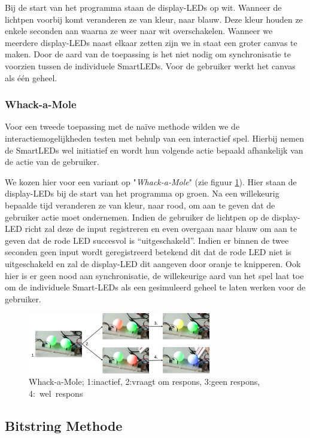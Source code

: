 \documentclass{article}
\begin{document}
Bij de start van het programma staan de display-LEDs op wit. Wanneer de lichtpen voorbij komt veranderen ze van kleur, naar blauw. Deze kleur houden ze enkele seconden aan waarna ze weer naar wit overschakelen. Wanneer we meerdere display-LEDs naast elkaar zetten zijn we in staat een groter canvas te maken. Door de aard van de toepassing is het niet nodig om synchronisatie te voorzien tussen de individuele SmartLEDs. Voor de gebruiker werkt het canvas als \'e\'en geheel.


\subsubsection{Whack-a-Mole}
Voor een tweede toepassing met de na\"ive methode wilden we de interactiemogelijkheden testen met behulp van een interactief spel. Hierbij nemen de SmartLEDs wel initiatief en wordt hun volgende actie bepaald afhankelijk van de actie van de gebruiker. 

We kozen hier voor een variant op "\textit{Whack-a-Mole}" (zie figuur \ref{fig:mole}). Hier staan de display-LEDs bij de start van het programma op groen. Na een willekeurig bepaalde tijd veranderen ze van kleur, naar rood, om aan te geven dat de gebruiker actie moet ondernemen. Indien de gebruiker de lichtpen op de display-LED richt zal deze de input registreren en even overgaan naar blauw om aan te geven dat de rode LED succesvol is “uitgeschakeld”. Indien er binnen de twee seconden geen input wordt geregistreerd betekend dit dat de rode LED niet is uitgeschakeld en zal de display-LED dit aangeven door oranje te knipperen.  
Ook hier is er geen nood aan synchronisatie, de willekeurige aard van het spel laat toe om de individuele Smart-LEDs als een gesimuleerd geheel te laten werken voor de gebruiker.


\begin{figure}[H]
\centering
\includegraphics[width=8cm]{moleSequence.png}
\caption{Whack-a-Mole; 1:inactief, 2:vraagt om respons, 3:geen respons, \mbox{4: wel respons}}
\label{fig:mole}
\end{figure}

\subsection{Bitstring Methode}
\end{document}
